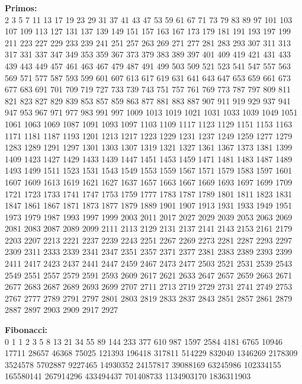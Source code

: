 \documentclass[10pt,landscape,twocolumn,a4paper,notitlepage]{article}
\begin{document}
		\textbf{Primos:}\\
		\vspace{3mm}
			2 3 5 7 11 13 17 19 23 29 31 37 41 43 47 53 59 61 67 71 73 79 83 89 97 101 103 107 109 113 127 131 137 139 149
			151 157 163 167 173 179 181 191 193 197 199 211 223 227 229 233 239 241 251 257 263 269 271 277 281 283 293 307
			311 313 317 331 337 347 349 353 359 367 373 379 383 389 397 401 409 419 421 431 433 439 443 449 457 461 463 467
			479 487 491 499 503 509 521 523 541 547 557 563 569 571 577 587 593 599 601 607 613 617 619 631 641 643 647 653
			659 661 673 677 683 691 701 709 719 727 733 739 743 751 757 761 769 773 787 797 809 811 821 823 827 829 839 853
			857 859 863 877 881 883 887 907 911 919 929 937 941 947 953 967 971 977 983 991 997 1009 1013 1019 1021 1031
			1033 1039 1049 1051 1061 1063 1069 1087 1091 1093 1097 1103 1109 1117 1123 1129 1151 1153 1163 1171 1181 1187
			1193 1201 1213 1217 1223 1229 1231 1237 1249 1259 1277 1279 1283 1289 1291 1297 1301 1303 1307 1319 1321 1327
			1361 1367 1373 1381 1399 1409 1423 1427 1429 1433 1439 1447 1451 1453 1459 1471 1481 1483 1487 1489 1493 1499
			1511 1523 1531 1543 1549 1553 1559 1567 1571 1579 1583 1597 1601 1607 1609 1613 1619 1621 1627 1637 1657 1663
			1667 1669 1693 1697 1699 1709 1721 1723 1733 1741 1747 1753 1759 1777 1783 1787 1789 1801 1811 1823 1831 1847
			1861 1867 1871 1873 1877 1879 1889 1901 1907 1913 1931 1933 1949 1951 1973 1979 1987 1993 1997 1999 2003 2011
			2017 2027 2029 2039 2053 2063 2069 2081 2083 2087 2089 2099 2111 2113 2129 2131 2137 2141 2143 2153 2161 2179
			2203 2207 2213 2221 2237 2239 2243 2251 2267 2269 2273 2281 2287 2293 2297 2309 2311 2333 2339 2341 2347 2351
			2357 2371 2377 2381 2383 2389 2393 2399 2411 2417 2423 2437 2441 2447 2459 2467 2473 2477 2503 2521 2531 2539
			2543 2549 2551 2557 2579 2591 2593 2609 2617 2621 2633 2647 2657 2659 2663 2671 2677 2683 2687 2689 2693 2699
			2707 2711 2713 2719 2729 2731 2741 2749 2753 2767 2777 2789 2791 2797 2801 2803 2819 2833 2837 2843 2851 2857
			2861 2879 2887 2897 2903 2909 2917 2927
	
	\vspace{8mm}
	\textbf{Fibonacci:}\\
	\vspace{3mm}
	0 1 1 2 3 5 8 13 21 34 55 89 144 233 377 610 987 1597 2584 4181 6765 10946 17711 28657 46368 75025 121393 196418 317811
	514229 832040 1346269 2178309 3524578 5702887 9227465 14930352 24157817 39088169 63245986 102334155 165580141 267914296
	433494437 701408733 1134903170 1836311903
	
\end{document}
